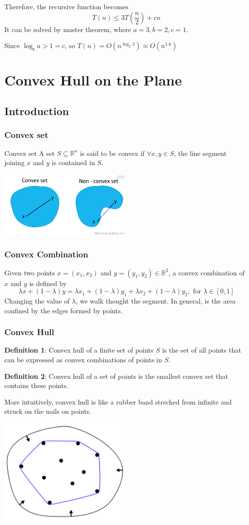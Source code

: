 \documentclass[en,hazy,blue,screen,14pt]{elegantnote}
\begin{document}
Therefore, the recursive function becomes
\[T(n) \le 3T(\frac{n}{2}) + cn\]
It can be solved by master theorem, where $a = 3, b = 2, c = 1$.

Since $\log_ba > 1 = c$, so $T(n) = O(n^{\log_2 3}) \approx O(n^{1.6})$
\section{Convex Hull on the Plane}
\subsection{Introduction}
\subsubsection{Convex set}
Convex set A set $S \subseteq \mathbb{R}^n$ is said to be convex if $\forall 
x,y \in S$, the line segment joining $x$ and $y$ is contained in $S$.

\centerline{\includegraphics[width=0.5\textwidth]{convex-nonconvex-set.png}}
\subsubsection{Convex Combination}
Given two points $x=(x_1, x_2)$ and $y = (y_1, y_2) \in \mathbb{R}^2$, a convex 
combination of $x$ and $y$ is defined by
\[\lambda x + (1 - \lambda) y = \lambda x_1 + (1 - \lambda)y_1 + \lambda x_2 + 
(1 - \lambda)y_2, \text{ for } \lambda \in [0,1]\]
Changing the value of $\lambda$, we walk thought the segment. In general, 
 is the area confined by the edges formed by points.
\subsubsection{Convex Hull}
\textbf{Definition 1}: Convex hull of a finite set of points $S$ is the set of 
all points that can be expressed as convex combinations of points in $S$. 

\textbf{Definition 2}: Convex hull of a set of points is the smallest convex 
set that contains these points.
 
More intuitively, convex hull is like a rubber band streched from infinite and 
struck on the nails on points.
\centerline{\includegraphics[width=0.5\textwidth]{ConvexHull.png}}
\end{document}
